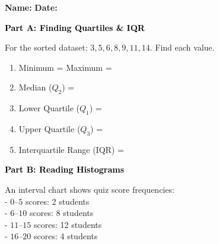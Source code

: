 \documentclass[12pt, letterpaper, fleqn]{article}
\newcommand{\blank}{\underline{\hspace{2.2cm}}}
\begin{document}
\textbf{Name:} \underline{\hspace{5cm}}
\hfill
\textbf{Date:} \underline{\hspace{3cm}}\\

\begin{tcolorbox}[colback=black!10]
    \large\textcolor{black}{\textbf{Part A: Finding Quartiles \& IQR}}
\end{tcolorbox}

\vspace{3mm}

\noindent
For the sorted dataset: $3, 5, 6, 8, 9, 11, 14$. Find each value.

\vspace{5mm}

\begin{enumerate}[itemsep=2.0cm, leftmargin=0.6cm]
\item Minimum = \blank \quad Maximum = \blank
\vspace{0.5cm}

\item Median ($Q_2$) = \blank
\vspace{0.5cm}

\item Lower Quartile ($Q_1$) = \blank
\vspace{0.5cm}

\item Upper Quartile ($Q_3$) = \blank
\vspace{0.5cm}

\item Interquartile Range (IQR) = \blank
\end{enumerate}

\newpage

\begin{tcolorbox}[colback=black!10]
    \large\textcolor{black}{\textbf{Part B: Reading Histograms}}
\end{tcolorbox}

\vspace{3mm}

\noindent
An interval chart shows quiz score frequencies: \\
- $0\text{--}5$ scores: 2 students \\
- $6\text{--}10$ scores: 8 students \\
- $11\text{--}15$ scores: 12 students \\
- $16\text{--}20$ scores: 4 students
\end{document}

